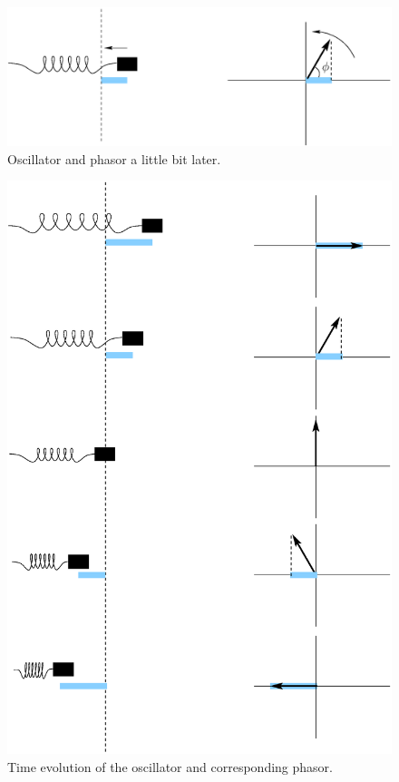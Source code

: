 \begin{figure}\begin{center}
 \includegraphics[width=4.0truein]{phasors/phasor03} 
\caption{\label{fig:phasor03}Oscillator and phasor a little bit later.}
\end{center}
\end{figure}

\begin{figure}\begin{center}
 \includegraphics[width=4.0truein]{phasors/phasor04} 
\end{center}\caption{\label{fig:phasor04}Time evolution of the oscillator
and corresponding phasor.}
\end{figure}


